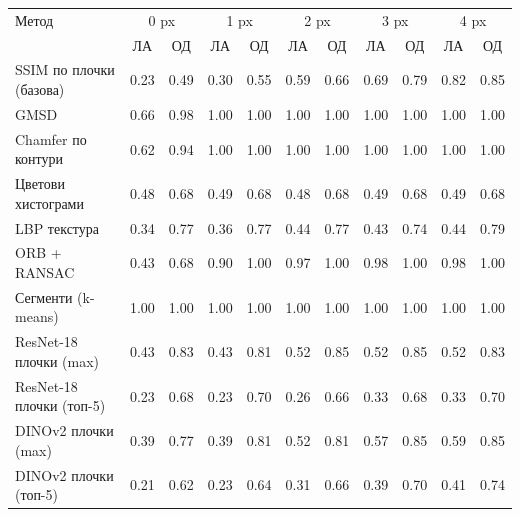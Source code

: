 \begin{tabular}{lcccccccccc}
\hline
Метод & \multicolumn{2}{c}{0 px} & \multicolumn{2}{c}{1 px} & \multicolumn{2}{c}{2 px} & \multicolumn{2}{c}{3 px} & \multicolumn{2}{c}{4 px} \\
 & ЛА & ОД & ЛА & ОД & ЛА & ОД & ЛА & ОД & ЛА & ОД \\
\hline
SSIM по плочки (базова) & 0.23 & 0.49 & 0.30 & 0.55 & 0.59 & 0.66 & 0.69 & 0.79 & 0.82 & 0.85 \\
GMSD & 0.66 & 0.98 & 1.00 & 1.00 & 1.00 & 1.00 & 1.00 & 1.00 & 1.00 & 1.00 \\
Chamfer по контури & 0.62 & 0.94 & 1.00 & 1.00 & 1.00 & 1.00 & 1.00 & 1.00 & 1.00 & 1.00 \\
Цветови хистограми & 0.48 & 0.68 & 0.49 & 0.68 & 0.48 & 0.68 & 0.49 & 0.68 & 0.49 & 0.68 \\
LBP текстура & 0.34 & 0.77 & 0.36 & 0.77 & 0.44 & 0.77 & 0.43 & 0.74 & 0.44 & 0.79 \\
ORB + RANSAC & 0.43 & 0.68 & 0.90 & 1.00 & 0.97 & 1.00 & 0.98 & 1.00 & 0.98 & 1.00 \\
Сегменти (k-means) & 1.00 & 1.00 & 1.00 & 1.00 & 1.00 & 1.00 & 1.00 & 1.00 & 1.00 & 1.00 \\
ResNet-18 плочки (max) & 0.43 & 0.83 & 0.43 & 0.81 & 0.52 & 0.85 & 0.52 & 0.85 & 0.52 & 0.83 \\
ResNet-18 плочки (топ-5) & 0.23 & 0.68 & 0.23 & 0.70 & 0.26 & 0.66 & 0.33 & 0.68 & 0.33 & 0.70 \\
DINOv2 плочки (max) & 0.39 & 0.77 & 0.39 & 0.81 & 0.52 & 0.81 & 0.57 & 0.85 & 0.59 & 0.85 \\
DINOv2 плочки (топ-5) & 0.21 & 0.62 & 0.23 & 0.64 & 0.31 & 0.66 & 0.39 & 0.70 & 0.41 & 0.74 \\
\hline
\end{tabular}

